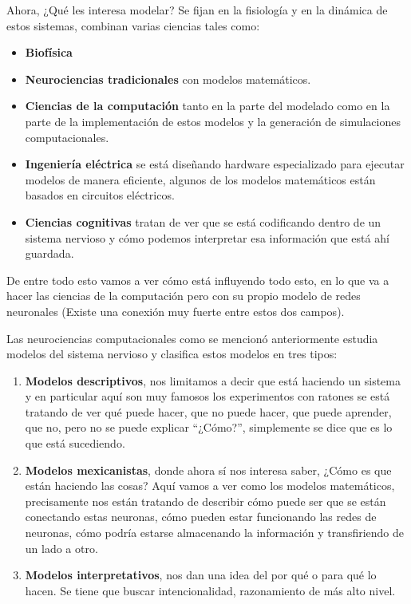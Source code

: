 Ahora, ¿Qué les interesa modelar? Se fijan en la fisiología y en la dinámica de estos sistemas, combinan varias ciencias tales como: 
\begin{itemize}
 \item  \textbf{Biofísica} 
 \item  \textbf{Neurociencias tradicionales} con modelos matemáticos. 
 \item  \textbf{Ciencias de la computación} tanto en la parte del modelado como en la parte de la implementación de estos modelos y la generación de simulaciones computacionales.
 \item  \textbf{Ingeniería eléctrica} se está diseñando hardware especializado para ejecutar modelos de manera eficiente, algunos de los modelos matemáticos están basados en circuitos eléctricos. 
 \item  \textbf{Ciencias cognitivas} tratan de ver que se está codificando dentro de un sistema nervioso y cómo podemos interpretar esa información que está ahí guardada.

\end{itemize}

De entre todo esto vamos a ver cómo está influyendo todo esto, en lo que va a hacer las ciencias de la computación pero con su propio modelo de redes neuronales (Existe una conexión muy fuerte entre estos dos campos).


Las neurociencias computacionales como se mencionó anteriormente estudia modelos del sistema nervioso y clasifica estos modelos en tres tipos: 
\begin{enumerate}
 \item \textbf{Modelos descriptivos}, nos limitamos a decir que está haciendo un sistema y en particular aquí son muy famosos los experimentos con ratones se está tratando de ver qué puede hacer, que no puede hacer, que puede aprender, que no, pero no se puede explicar “¿Cómo?”, simplemente se dice que es lo que está sucediendo. 
 \item \textbf{Modelos mexicanistas}, donde ahora sí nos interesa saber, ¿Cómo es que están haciendo las cosas? Aquí vamos a ver como los modelos matemáticos, precisamente nos están tratando de describir cómo puede ser que se están conectando estas neuronas, cómo pueden estar funcionando las redes de neuronas, cómo podría estarse almacenando la información y transfiriendo de un lado a otro. 
 \item \textbf{Modelos interpretativos}, nos dan una idea del por qué o para qué lo hacen. Se tiene que buscar intencionalidad, razonamiento de más alto nivel.
\end{enumerate}

